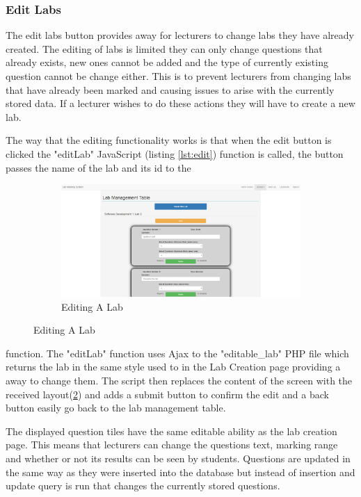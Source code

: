 \documentclass[12pt]{article}  %
\begin{document}
\subsubsection{Edit Labs}
The edit labs button provides away for lecturers to change labs they have already created. The editing of labs is limited they can only change questions that already exists, new ones cannot be added and the type of currently existing question cannot be change either. This is to prevent lecturers from changing labs that have already been marked and causing issues to arise with the currently stored data. If a lecturer wishes to do these actions they will have to create a new lab.



\noindent The way that the editing functionality works is that when  the edit button is clicked the "editLab" JavaScript (listing \ref{lst:edit}) function is called, the button passes the name of the lab and its id to the

\begin{figure}
\vspace*{-\baselineskip}
\begin{figure}[H]
    \centering
    \includegraphics[width=1\textwidth]{images/implementation/edit-lab-page.png}
    \caption{Editing A Lab}
    \label{fig:edit-lab}
\end{figure}
\end{figure}

\noindent function. The "editLab" function uses Ajax to the "editable\_lab" PHP file which returns the lab in the same style used to in the Lab Creation page providing a away to change them. The script then replaces the content of the screen with the received layout(\ref{fig:edit-lab}) and adds a submit button to confirm the edit and a back button easily go back to the lab management table.

\noindent The displayed question tiles have the same editable ability as the lab creation page. This means that lecturers can change the questions text, marking range and whether or not its results can be seen by students. Questions are updated in the same way as they were inserted into the database but instead of insertion and update query is run that changes the currently stored questions.
\end{document}
